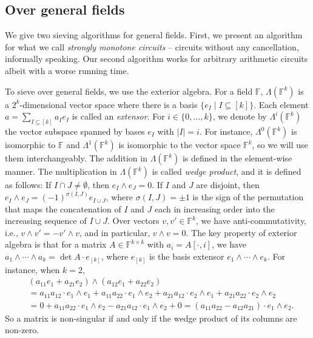 \documentclass{theoretics}
\newcommand{\F}{\ensuremath{\mathbb F}\xspace}
\begin{document}
\subsection{Over general fields}
\label{sec:extensor}

We give two sieving algorithms for general fields.
First, we present an algorithm for what we call \emph{strongly monotone circuits} -- circuits without any cancellation, informally speaking.
Our second algorithm works for arbitrary arithmetic circuits albeit with a worse running time.

To sieve over general fields, we use the exterior algebra.
For a field $\F$, $\Lambda(\F^k)$ is a $2^k$-dimensional vector space where there is a basis $\{ e_I \mid I \subseteq [k] \}$.
Each element $a = \sum_{I \subseteq [k]} {a_I} e_I$ is called an \emph{extensor}.
For $i \in \{ 0, \ldots, k \}$, we denote by $\Lambda^i(\F^k)$ the vector subspace spanned by bases $e_I$ with $|I| = i$.
For instance, $\Lambda^0(\F^k)$ is isomorphic to $\F$ and $\Lambda^1(\F^k)$ is isomorphic to the vector space $\F^k$, so we will use them interchangeably.
The addition in $\Lambda(\F^k)$ is defined in the element-wise manner.
The multiplication in $\Lambda(\F^k)$ is called \emph{wedge product}, and it is defined as follows:
If $I \cap J \ne \emptyset$, then $e_I \wedge e_J = 0$.
If $I$ and $J$ are disjoint, then $e_I \wedge e_J = (-1)^{\sigma(I, J)} e_{I \cup J}$, where $\sigma(I, J) = \pm 1$ is the sign of the permutation that maps the concatenation of $I$ and $J$ each in increasing order into the increasing sequence of $I \cup J$.
Over vectors $v, v' \in \F^k$, we have anti-commutativity, i.e., $v \wedge v' = -v' \wedge v$, and in particular, $v \wedge v = 0$.
The key property of exterior algebra is that for a matrix $A \in \F^{k \times k}$ with $a_i = A[\cdot, i]$, we have $a_1 \wedge \cdots \wedge a_k = \det A \cdot e_{[k]}$, where $e_{[k]}$ is the basis extensor $e_1 \wedge \cdots \wedge e_k$.
For instance, when $k = 2$,
\begin{align*}
  &(a_{11} e_1 + a_{21} e_2) \wedge (a_{12} e_1 + a_{22} e_2) \\
  &= a_{11} a_{12} \cdot e_1 \wedge e_1 + a_{11} a_{22} \cdot e_1 \wedge e_2 + a_{21} a_{12} \cdot e_2 \wedge e_1 + a_{21} a_{22} \cdot e_2 \wedge e_2 \\
  &= 0 + a_{11} a_{22} \cdot e_1 \wedge e_2 - a_{21} a_{12} \cdot e_1 \wedge e_2 + 0 = (a_{11} a_{22} - a_{12} a_{21}) \cdot e_1 \wedge e_2.
\end{align*}
So a matrix is non-singular if and only if the wedge product of its columns are non-zero.
\end{document}
